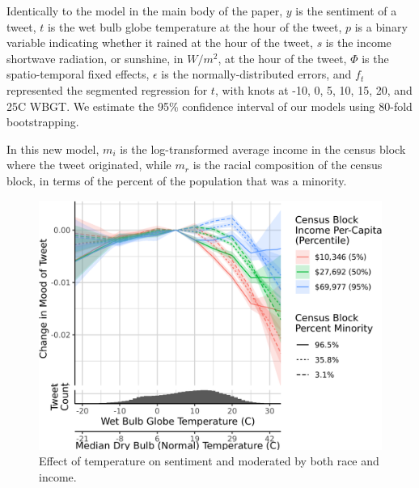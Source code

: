 \documentclass{article}
\begin{document}
Identically to the model in the main body of the paper, $y$ is the sentiment of a tweet, $t$ is the wet bulb globe temperature at the hour of the tweet, $p$ is a binary variable indicating whether it rained at the hour of the tweet, $s$ is the income shortwave radiation, or sunshine, in $W/m^2$, at the hour of the tweet, $\Phi$ is the spatio-temporal fixed effects, $\epsilon$ is the normally-distributed errors, and $f_t$ represented the segmented regression for $t$, with knots at -10\textdegree, 0\textdegree, 5\textdegree, 10\textdegree, 15\textdegree, 20\textdegree, and 25\textdegree C WBGT.  We estimate the 95\% confidence interval of our models using 80-fold bootstrapping.  

In this new model, $m_{i}$ is the log-transformed average income in the census block where the tweet originated, while $m_{r}$ is the racial composition of the census block, in terms of the percent of the population that was a minority.

\begin{figure}[H]
  \centering
  \includegraphics[width=0.6\linewidth]{../res/wbgt-income-race.png}
  \caption{Effect of temperature on sentiment and moderated by both race and income.}
  \label{fig:timeseries}
\end{figure}
\end{document}
